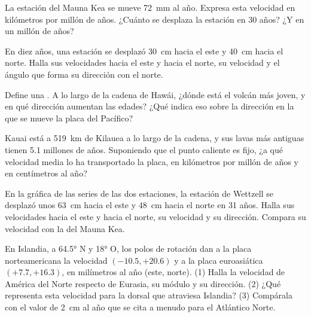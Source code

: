\begin{exercise}[$\star$]\label{exo:g11:plate-motions:2}
La estación del Mauna Kea se mueve \qty{72}{mm} al año. Expresa esta velocidad
en kilómetros por millón de años. ¿Cuánto se desplaza la estación en 30 años?
¿Y en un millón de años?
\end{exercise}

\begin{exercise}[$\star$]\label{exo:g11:plate-motions:3}
En diez años, una estación se desplazó \qty{30}{cm} hacia el este y
\qty{40}{cm} hacia el norte. Halla sus velocidades hacia el este y hacia el
norte, su velocidad y el ángulo que forma su dirección con el norte.
\end{exercise}

\begin{exercise}[$\star$]\label{exo:g11:plate-motions:4}
Define una . A lo largo de la cadena de Hawái, ¿dónde
está el volcán más joven, y en qué dirección aumentan las edades? ¿Qué indica
eso sobre la dirección en la que se mueve la placa del Pacífico?
\end{exercise}

\begin{exercise}[$\star$]\label{exo:g11:plate-motions:5}
Kauai está a \qty{519}{km} de Kilauea a lo largo de la cadena, y sus lavas más
antiguas tienen \num{5.1} millones de años. Suponiendo que el punto caliente
es fijo, ¿a qué velocidad media lo ha transportado la placa, en kilómetros por
millón de años y en centímetros al año?
\end{exercise}

\begin{exercise}[$\star\star$]\label{exo:g11:plate-motions:6}
En la gráfica de las series de las dos estaciones, la estación de Wettzell se
desplazó unos \qty{63}{cm} hacia el este y \qty{48}{cm} hacia el norte en 31
años. Halla sus velocidades hacia el este y hacia el norte, su velocidad y su
dirección. Compara su velocidad con la del Mauna Kea.
\end{exercise}

\begin{exercise}[$\star\star$]\label{exo:g11:plate-motions:7}
En Islandia, a \ang{64.5} N y \ang{18} O, los polos de rotación dan a la placa
norteamericana la velocidad $(-10.5, +20.6)$ y a la placa euroasiática
$(+7.7, +16.3)$, en milímetros al año (este, norte). (1) Halla la velocidad de
América del Norte respecto de Eurasia, su módulo y su dirección. (2) ¿Qué
representa esta velocidad para la dorsal que atraviesa Islandia? (3) Compárala
con el valor de \qty{2}{cm} al año que se cita a menudo para el Atlántico
Norte.
\end{exercise}

